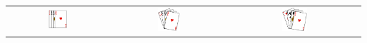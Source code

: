 \documentclass[a5paper,french]{article}
\begin{document}

\begin{center}
	\begin{tabular}[c]{ c c c }

		\includegraphics[width=0.20\textwidth]{img/MainCarteExample1.png} &	
		\includegraphics[width=0.20\textwidth]{img/MainCarteExample2.png} &	
		\includegraphics[width=0.20\textwidth]{img/MainCarteExample3.png} \\

	\end{tabular}
\end{center}




\clearpage

\end{document}
